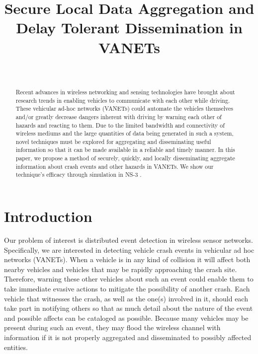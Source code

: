 \documentclass{IEEEtran}
\begin{document}
\title{Secure Local Data Aggregation and Delay Tolerant Dissemination in VANETs}
\author{\\
}
\maketitle

\begin{abstract}

Recent advances in wireless networking and sensing technologies have brought about research trends in enabling vehicles to communicate with each other while driving.  These vehicular ad-hoc networks (VANETs) could automate the vehicles themselves and/or greatly decrease dangers inherent with driving by warning each other of hazards and reacting to them.
Due to the limited bandwidth and connectivity of wireless mediums and the large quantities of data being generated in such a system, novel techniques must be explored for aggregating and disseminating useful information so that it can be made available in a reliable and timely manner.
In this paper, we propose a method of securely, quickly, and locally disseminating aggregate information about crash events and other hazards in VANETs.
We show our technique's efficacy through simulation in NS-3 \cite{ns3}.
\end{abstract}

\section{Introduction}

Our problem of interest is distributed event detection in wireless sensor networks. Specifically, we are interested in detecting vehicle crash events in vehicular ad hoc networks (VANETs).
When a vehicle is in any kind of collision it will affect both nearby vehicles and vehicles that may be rapidly approaching the crash site.
Therefore, warning these other vehicles about such an event could enable them to take immediate evasive actions to mitigate the possibility of another crash.
Each vehicle that witnesses the crash, as well as the one(s) involved in it, should each take part in notifying others so that as much detail about the nature of the event and possible affects can be cataloged as possible.
Because many vehicles may be present during such an event, they may flood the wireless channel with information if it is not properly aggregated and disseminated to possibly affected entities.
\end{document}
